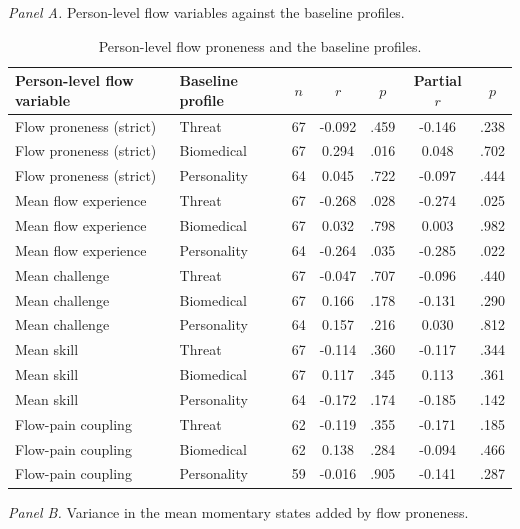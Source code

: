 \begin{table}[!htbp]
\raggedright
\caption{Person-level flow proneness and the baseline profiles.}
\label{tab:sup-personlevel}
\footnotesize
\begingroup
\setlength{\tabcolsep}{4pt}
\renewcommand{\arraystretch}{1.08}
\noindent\textit{Panel A.} Person-level flow variables against the baseline profiles.\par\vspace{2pt}
\begin{tabular*}{\textwidth}{@{\extracolsep{\fill}}llccccc@{}}
\toprule
Person-level flow variable & Baseline profile & $n$ & $r$ & $p$ & Partial $r$ & $p$  \\
\midrule
Flow proneness (strict) & Threat & 67 & -0.092 & .459 & -0.146 & .238 \\
Flow proneness (strict) & Biomedical & 67 & 0.294 & .016 & 0.048 & .702 \\
Flow proneness (strict) & Personality & 64 & 0.045 & .722 & -0.097 & .444 \\
Mean flow experience & Threat & 67 & -0.268 & .028 & -0.274 & .025 \\
Mean flow experience & Biomedical & 67 & 0.032 & .798 & 0.003 & .982 \\
Mean flow experience & Personality & 64 & -0.264 & .035 & -0.285 & .022 \\
Mean challenge & Threat & 67 & -0.047 & .707 & -0.096 & .440 \\
Mean challenge & Biomedical & 67 & 0.166 & .178 & -0.131 & .290 \\
Mean challenge & Personality & 64 & 0.157 & .216 & 0.030 & .812 \\
Mean skill & Threat & 67 & -0.114 & .360 & -0.117 & .344 \\
Mean skill & Biomedical & 67 & 0.117 & .345 & 0.113 & .361 \\
Mean skill & Personality & 64 & -0.172 & .174 & -0.185 & .142 \\
Flow-pain coupling & Threat & 62 & -0.119 & .355 & -0.171 & .185 \\
Flow-pain coupling & Biomedical & 62 & 0.138 & .284 & -0.094 & .466 \\
Flow-pain coupling & Personality & 59 & -0.016 & .905 & -0.141 & .287 \\
\bottomrule
\end{tabular*}
\par\vspace{6pt}\noindent\textit{Panel B.} Variance in the mean momentary states added by flow proneness.\par\vspace{2pt}

\end{table}
